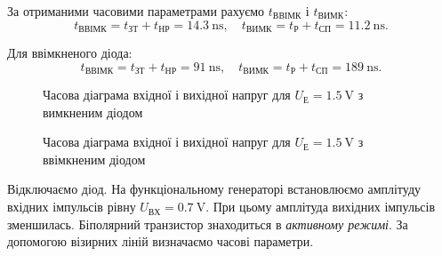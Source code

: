 \documentclass[a4paper,oneside,DIV=10,12pt]{scrartcl}
\begin{document}
		За отриманими часовими параметрами рахуємо $t_{\text{ВВІМК}}$ і $t_{\text{ВИМК}}$:
		\[
			t_{\text{ВВІМК}} = t_{\text{ЗТ}} + t_{\text{НР}} = \SI{14,3}{\nano\second}, \quad t_{\text{ВИМК}} = t_{\text{Р}} + t_{\text{СП}} = \SI{11,2}{\nano\second}.
		\]
		
		Для ввімкненого діода:
		\[
			t_{\text{ВВІМК}} = t_{\text{ЗТ}} + t_{\text{НР}} = \SI{91}{\nano\second}, \quad t_{\text{ВИМК}} = t_{\text{Р}} + t_{\text{СП}} = \SI{189}{\nano\second}.
		\]
		
		
		\begin{figure}[H]
		\label{fig:u1p5nodiode}
		\centering
			\def\svgwidth{\columnwidth}
			
		\caption{Часова діаграма вхідної і вихідної напруг для $U_{\text{Е}} = \SI{1,5}{\volt}$ з вимкненим діодом}
		\end{figure}
		
		\begin{figure}[H]
		\label{fig:u1p5diode}
		\centering
			\def\svgwidth{\columnwidth}
			
		\caption{Часова діаграма вхідної і вихідної напруг для $U_{\text{Е}} = \SI{1,5}{\volt}$ з ввімкненим діодом}
		\end{figure}
		
		\newpage
		
		Відключаємо діод. На функціональному генераторі встановлюємо амплітуду вхідних імпульсів рівну $U_{\text{ВХ}} = \SI{0,7}{\volt}$. При цьому амплітуда вихідних імпульсів зменшилась. Біполярний транзистор знаходиться в \emph{активному режимі}. За допомогою візирних ліній визначаємо часові параметри.
		
\end{document}

